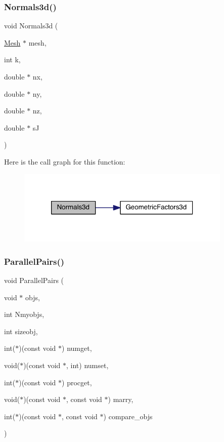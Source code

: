 \subsubsection{\texorpdfstring{Normals3d()}{Normals3d()}}
{\footnotesize\ttfamily void Normals3d (\begin{DoxyParamCaption}\item[{\hyperlink{a00557_aeffbe0891ab73a4d8964c9cb7978426e}{Mesh} $\ast$}]{mesh,  }\item[{int}]{k,  }\item[{double $\ast$}]{nx,  }\item[{double $\ast$}]{ny,  }\item[{double $\ast$}]{nz,  }\item[{double $\ast$}]{sJ }\end{DoxyParamCaption})}

Here is the call graph for this function\+:\nopagebreak
\begin{figure}[H]
\begin{center}
\leavevmode
\includegraphics[width=290pt]{a00554_a7dad59f4c5add70012ffb84d688ce948_cgraph}
\end{center}
\end{figure}
\mbox{\label{a00554_a20e0973b5bd186b5b6a4be06801451b6}} 
\subsubsection{\texorpdfstring{Parallel\+Pairs()}{ParallelPairs()}}
{\footnotesize\ttfamily void Parallel\+Pairs (\begin{DoxyParamCaption}\item[{void $\ast$}]{objs,  }\item[{int}]{Nmyobjs,  }\item[{int}]{sizeobj,  }\item[{int($\ast$)(const void $\ast$)}]{numget,  }\item[{void($\ast$)(const void $\ast$, int)}]{numset,  }\item[{int($\ast$)(const void $\ast$)}]{procget,  }\item[{void($\ast$)(const void $\ast$, const void $\ast$)}]{marry,  }\item[{int($\ast$)(const void $\ast$, const void $\ast$)}]{compare\+\_\+objs }\end{DoxyParamCaption})}

